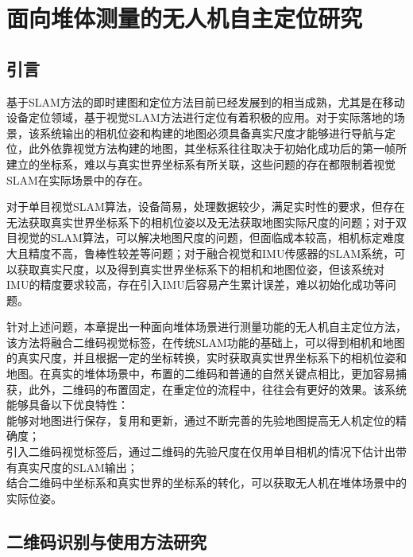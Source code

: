 \chapter{面向堆体测量的无人机自主定位研究}
\label{cha:chap2}
\section{引言}
\label{sec:2.1}
基于SLAM方法的即时建图和定位方法目前已经发展到的相当成熟，尤其是在移动设备定位领域，基于视觉SLAM方法进行定位有着积极的应用。对于实际落地的场景，该系统输出的相机位姿和构建的地图必须具备真实尺度才能够进行导航与定位，此外依靠视觉方法构建的地图，其坐标系往往取决于初始化成功后的第一帧所建立的坐标系，难以与真实世界坐标系有所关联，这些问题的存在都限制着视觉SLAM在实际场景中的存在。

对于单目视觉SLAM算法，设备简易，处理数据较少，满足实时性的要求，但存在无法获取真实世界坐标系下的相机位姿以及无法获取地图实际尺度的问题；对于双目视觉的SLAM算法，可以解决地图尺度的问题，但面临成本较高，相机标定难度大且精度不高，鲁棒性较差等问题；对于融合视觉和IMU传感器的SLAM系统，可以获取真实尺度，以及得到真实世界坐标系下的相机和地图位姿，但该系统对IMU的精度要求较高，存在引入IMU后容易产生累计误差，难以初始化成功等问题。

针对上述问题，本章提出一种面向堆体场景进行测量功能的无人机自主定位方法，该方法将融合二维码视觉标签，在传统SLAM功能的基础上，可以得到相机和地图的真实尺度，并且根据一定的坐标转换，实时获取真实世界坐标系下的相机位姿和地图。在真实的堆体场景中，布置的二维码和普通的自然关键点相比，更加容易捕获，此外，二维码的布置固定，在重定位的流程中，往往会有更好的效果。该系统能够具备以下优良特性：\\
能够对地图进行保存，复用和更新，通过不断完善的先验地图提高无人机定位的精确度；\\
引入二维码视觉标签后，通过二维码的先验尺度在仅用单目相机的情况下估计出带有真实尺度的SLAM输出；\\
结合二维码中坐标系和真实世界的坐标系的转化，可以获取无人机在堆体场景中的实际位姿。

\section{二维码识别与使用方法研究}
\label{sec:2.2}
